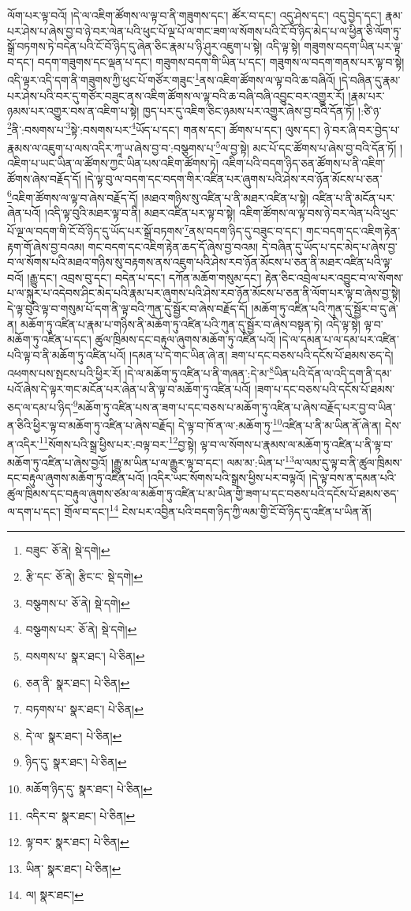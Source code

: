 ལོག་པར་ལྟ་བའོ། །དེ་ལ་འཇིག་ཚོགས་ལ་ལྟ་བ་ནི་གཟུགས་དང་། ཚོར་བ་དང་། འདུ་ཤེས་དང་། འདུ་བྱེད་དང་། རྣམ་པར་ཤེས་པ་ཞེས་བྱ་བ་ཉེ་བར་ལེན་པའི་ཕུང་པོ་ལྔ་པོ་ལ་གང་ཟག་ལ་སོགས་པའི་ངོ་བོ་ཉིད་མེད་པ་ལ་ཕྱིན་ཅི་ལོག་ཏུ་སྒྲོ་བཏགས་ཏེ་བདེན་པའི་ངོ་བོ་ཉིད་དུ་ཞེན་ཅིང་རྣམ་པ་ཉི་ཤུར་འཇུག་པ་སྟེ། འདི་ལྟ་སྟེ། གཟུགས་བདག་ཡིན་པར་ལྟ་བ་དང་། བདག་གཟུགས་དང་ལྡན་པ་དང་། གཟུགས་བདག་གི་ཡིན་པ་དང་། གཟུགས་ལ་བདག་གནས་པར་ལྟ་བ་སྟེ། འདི་ལྟར་འདི་དག་ནི་གཟུགས་ཀྱི་ཕུང་པོ་གཙོར་གཟུང་\footnote{བཟུང་  ཅོ་ནེ།  སྡེ་དགེ། }ནས་འཇིག་ཚོགས་ལ་ལྟ་བའི་ཆ་བཞིའོ། །དེ་བཞིན་དུ་རྣམ་པར་ཤེས་པའི་བར་དུ་གཙོར་བཟུང་ནས་འཇིག་ཚོགས་ལ་ལྟ་བའི་ཆ་བཞི་བཞི་འབྱུང་བར་འགྱུར་རོ། །རྣམ་པར་ཉམས་པར་འགྱུར་བས་ན་འཇིག་པ་སྟེ། ཁྱད་པར་དུ་འཇིག་ཅིང་ཉམས་པར་འགྱུར་ཞེས་བྱ་བའི་དོན་ཏོ། །:ཙི་ཉ་\footnote{རྩི་དང་  ཅོ་ནེ། རྩིང་ང་  སྡེ་དགེ། }ནི་:བསགས་པ་\footnote{བསྩགས་པ་  ཅོ་ནེ།  སྡེ་དགེ། }སྟེ་:བསགས་པར་\footnote{བསྩགས་པར་  ཅོ་ནེ།  སྡེ་དགེ། }ཡོད་པ་དང་། གནས་དང་། ཚོགས་པ་དང་། ལུས་དང་། ཉེ་བར་ཞི་བར་བྱེད་པ་རྣམས་ལ་འཇུག་པ་ལས་འདིར་ཀཱ་ཡ་ཞེས་བྱ་བ་:བསྩགས་པ་\footnote{བསགས་པ་  སྣར་ཐང་།  པེ་ཅིན། }ལ་བྱ་སྟེ། མང་པོ་དང་ཚོགས་པ་ཞེས་བྱ་བའི་དོན་ཏོ། །འཇིག་པ་ཡང་ཡིན་ལ་ཚོགས་ཀྱང་ཡིན་པས་འཇིག་ཚོགས་ཏེ། འཇིག་པའི་བདག་ཉིད་ཅན་ཚོགས་པ་ནི་འཇིག་ཚོགས་ཞེས་བརྗོད་དོ། །དེ་ལྟ་བུ་ལ་བདག་དང་བདག་གིར་འཛིན་པར་ཞུགས་པའི་ཤེས་རབ་ཉོན་མོངས་པ་ཅན་\footnote{ཅན་ནི་  སྣར་ཐང་།  པེ་ཅིན། }འཇིག་ཚོགས་ལ་ལྟ་བ་ཞེས་བརྗོད་དོ། །མཐའ་གཉིས་སུ་འཛིན་པ་ནི་མཐར་འཛིན་པ་སྟེ། འཛིན་པ་ནི་མངོན་པར་ཞེན་པའོ། །འདི་ལྟ་བུའི་མཐར་ལྟ་བ་ནི། མཐར་འཛིན་པར་ལྟ་བ་སྟེ། འཇིག་ཚོགས་ལ་ལྟ་བས་ཉེ་བར་ལེན་པའི་ཕུང་པོ་ལྔ་ལ་བདག་གི་ངོ་བོ་ཉིད་དུ་ཡོད་པར་སྒྲོ་བཏགས་\footnote{བཏགས་པ་  སྣར་ཐང་།  པེ་ཅིན། }ནས་བདག་ཉིད་དུ་བཟུང་བ་དང་། གང་བདག་དང་འཇིག་རྟེན་རྟག་གོ་ཞེས་བྱ་བའམ། གང་བདག་དང་འཇིག་རྟེན་ཆད་དོ་ཞེས་བྱ་བའམ། དེ་བཞིན་དུ་ཡོད་པ་དང་མེད་པ་ཞེས་བྱ་བ་ལ་སོགས་པའི་མཐའ་གཉིས་སུ་བརྟགས་ནས་འཇུག་པའི་ཤེས་རབ་ཉོན་མོངས་པ་ཅན་ནི་མཐར་འཛིན་པའི་ལྟ་བའོ། །རྒྱུ་དང་། འབྲས་བུ་དང་། བདེན་པ་དང་། དཀོན་མཆོག་གསུམ་དང་། རྟེན་ཅིང་འབྲེལ་པར་འབྱུང་བ་ལ་སོགས་པ་ལ་སྐུར་པ་འདེབས་ཤིང་མེད་པའི་རྣམ་པར་ཞུགས་པའི་ཤེས་རབ་ཉོན་མོངས་པ་ཅན་ནི་ལོག་པར་ལྟ་བ་ཞེས་བྱ་སྟེ། དེ་ལྟ་བུའི་ལྟ་བ་གསུམ་པོ་དག་ནི་ལྟ་བའི་ཀུན་དུ་སྦྱོར་བ་ཞེས་བརྗོད་དོ། །མཆོག་ཏུ་འཛིན་པའི་ཀུན་དུ་སྦྱོར་བ་དུ་ཞེ་ན། མཆོག་ཏུ་འཛིན་པ་རྣམ་པ་གཉིས་ནི་མཆོག་ཏུ་འཛིན་པའི་ཀུན་དུ་སྦྱོར་བ་ཞེས་བསྟན་ཏེ། འདི་ལྟ་སྟེ། ལྟ་བ་མཆོག་ཏུ་འཛིན་པ་དང་། ཚུལ་ཁྲིམས་དང་བརྟུལ་ཞུགས་མཆོག་ཏུ་འཛིན་པའོ། །དེ་ལ་དམན་པ་ལ་དམ་པར་འཛིན་པའི་ལྟ་བ་ནི་མཆོག་ཏུ་འཛིན་པའོ། །དམན་པ་དེ་གང་ཡིན་ཞེ་ན། ཟག་པ་དང་བཅས་པའི་དངོས་པོ་ཐམས་ཅད་དེ། འཕགས་པས་སྤངས་པའི་ཕྱིར་རོ། །དེ་ལ་མཆོག་ཏུ་འཛིན་པ་ནི་གཞན་:དེ་མ་\footnote{དེ་ལ་  སྣར་ཐང་།  པེ་ཅིན། }ཡིན་པའི་དོན་ལ་འདི་དག་ནི་དམ་པའོ་ཞེས་དེ་ལྟར་གང་མངོན་པར་ཞེན་པ་ནི་ལྟ་བ་མཆོག་ཏུ་འཛིན་པའོ། །ཟག་པ་དང་བཅས་པའི་དངོས་པོ་ཐམས་ཅད་ལ་དམ་པ་ཉིད་\footnote{ཉིད་དུ་  སྣར་ཐང་།  པེ་ཅིན། }མཆོག་ཏུ་འཛིན་པས་ན་ཟག་པ་དང་བཅས་པ་མཆོག་ཏུ་འཛིན་པ་ཞེས་བརྗོད་པར་བྱ་བ་ཡིན་ན་ཅིའི་ཕྱིར་ལྟ་བ་མཆོག་ཏུ་འཛིན་པ་ཞེས་བརྗོད། དེ་ལྟ་བ་ཁོ་ན་ལ་:མཆོག་ཏུ་\footnote{མཆོག་ཉིད་དུ་  སྣར་ཐང་།  པེ་ཅིན། }འཛིན་པ་ནི་མ་ཡིན་ནོ་ཞེ་ན། དེས་ན་འདིར་\footnote{འདིར་བ་  སྣར་ཐང་།  པེ་ཅིན། }སོགས་པའི་སྒྲ་ཕྱིས་པར་:བལྟ་བར་\footnote{ལྟ་བར་  སྣར་ཐང་།  པེ་ཅིན། }བྱ་སྟེ། ལྟ་བ་ལ་སོགས་པ་རྣམས་ལ་མཆོག་ཏུ་འཛིན་པ་ནི་ལྟ་བ་མཆོག་ཏུ་འཛིན་པ་ཞེས་བྱའོ། །རྒྱུ་མ་ཡིན་པ་ལ་རྒྱུར་ལྟ་བ་དང་། ལམ་མ་:ཡིན་པ་\footnote{ཡིན་  སྣར་ཐང་།  པེ་ཅིན། }ལ་ལམ་དུ་ལྟ་བ་ནི་ཚུལ་ཁྲིམས་དང་བརྟུལ་ཞུགས་མཆོག་ཏུ་འཛིན་པའོ། །འདིར་ཡང་སོགས་པའི་སྒྲས་ཕྱིས་པར་བལྟའོ། །དེ་ལྟ་བས་ན་དམན་པའི་ཚུལ་ཁྲིམས་དང་བརྟུལ་ཞུགས་ཙམ་ལ་མཆོག་ཏུ་འཛིན་པ་མ་ཡིན་གྱི་ཟག་པ་དང་བཅས་པའི་དངོས་པོ་ཐམས་ཅད་ལ་དག་པ་དང་། གྲོལ་བ་དང་།\footnote{ལ།  སྣར་ཐང་། } ངེས་པར་འབྱིན་པའི་བདག་ཉིད་ཀྱི་ལམ་གྱི་ངོ་བོ་ཉིད་དུ་འཛིན་པ་ཡིན་ནོ། 
